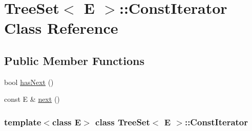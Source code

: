 \hypertarget{class_tree_set_1_1_const_iterator}{
\section{TreeSet$<$ E $>$::ConstIterator Class Reference}
\label{class_tree_set_1_1_const_iterator}
}
\subsection*{Public Member Functions}
\begin{DoxyCompactItemize}
\item 
bool \hyperlink{class_tree_set_1_1_const_iterator_a0a374c508f338af8a69205cbfa337d3f}{hasNext} ()
\item 
const E \& \hyperlink{class_tree_set_1_1_const_iterator_ae5b2a27e836eaea208a6a1a145085c92}{next} ()
\end{DoxyCompactItemize}
\subsubsection*{template$<$class E$>$ class TreeSet$<$ E $>$::ConstIterator}



